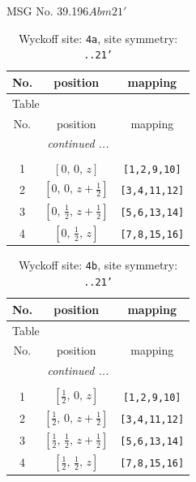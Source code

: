 \documentclass[fleqn,8pt]{jsarticle}
\begin{document}
\setcounter{MaxMatrixCols}{32}

\renewcommand{\tablename}{Table~}
\renewcommand{\figurename}{Figure~}
\begin{center}
\LARGE
MSG No. 39.196\quad$Abm21'$
\end{center}
\renewcommand{\arraystretch}{1.2}
\begin{longtable}{ccc}
\caption{Wyckoff site: {\tt 4a}, site symmetry: {\tt ..21'}}
 \\
 \hline \hline
No. & position & mapping \\ \hline \endfirsthead

\multicolumn{2}{l}{\tablename\ \thetable{}} \\
 \hline \hline
No. & position & mapping \\ \hline \endhead

 \hline \hline
\multicolumn{2}{r}{\footnotesize\it continued ...} \\ \endfoot

 \hline \hline
\multicolumn{2}{r}{} \\ \endlastfoot

1 & $\left[ 0,\, 0,\, z \right]$ & {\tt [1,2,9,10]} \\ \hline
2 & $\left[ 0,\, 0,\, z + \frac{1}{2} \right]$ & {\tt [3,4,11,12]} \\ \hline
3 & $\left[ 0,\, \frac{1}{2},\, z + \frac{1}{2} \right]$ & {\tt [5,6,13,14]} \\ \hline
4 & $\left[ 0,\, \frac{1}{2},\, z \right]$ & {\tt [7,8,15,16]} \\
\end{longtable}
\renewcommand{\arraystretch}{1.2}
\begin{longtable}{ccc}
\caption{Wyckoff site: {\tt 4b}, site symmetry: {\tt ..21'}}
 \\
 \hline \hline
No. & position & mapping \\ \hline \endfirsthead

\multicolumn{2}{l}{\tablename\ \thetable{}} \\
 \hline \hline
No. & position & mapping \\ \hline \endhead

 \hline \hline
\multicolumn{2}{r}{\footnotesize\it continued ...} \\ \endfoot

 \hline \hline
\multicolumn{2}{r}{} \\ \endlastfoot

1 & $\left[ \frac{1}{2},\, 0,\, z \right]$ & {\tt [1,2,9,10]} \\ \hline
2 & $\left[ \frac{1}{2},\, 0,\, z + \frac{1}{2} \right]$ & {\tt [3,4,11,12]} \\ \hline
3 & $\left[ \frac{1}{2},\, \frac{1}{2},\, z + \frac{1}{2} \right]$ & {\tt [5,6,13,14]} \\ \hline
4 & $\left[ \frac{1}{2},\, \frac{1}{2},\, z \right]$ & {\tt [7,8,15,16]} \\
\end{longtable}
\end{document}
